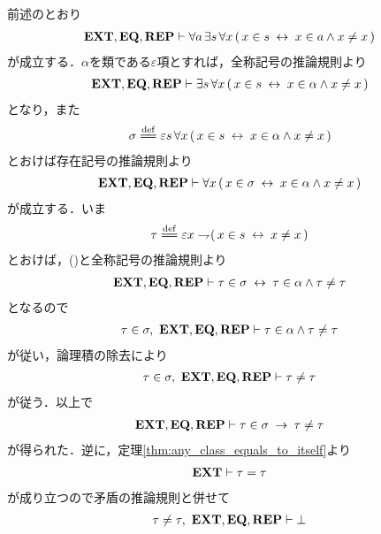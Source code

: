 	\begin{sketch}
		前述のとおり
		\begin{align}
			\mbox{{\bf EXT}},\mbox{{\bf EQ}},\mbox{{\bf REP}} \vdash \forall a\, \exists s\, \forall x\,
			(\, x \in s \hspace{0.25em}\leftrightarrow\hspace{0.25em} x \in a \wedge x \neq x\, )
			\label{fom:thm_emptyset_is_a_set_1}
		\end{align}
		が成立する．$\alpha$を類である$\varepsilon$項とすれば，全称記号の推論規則より
		\begin{align}
			\mbox{{\bf EXT}},\mbox{{\bf EQ}},\mbox{{\bf REP}} \vdash \exists s\, \forall x\,
			(\, x \in s \hspace{0.25em}\leftrightarrow\hspace{0.25em} x \in \alpha \wedge x \neq x\, )
		\end{align}
		となり，また
		\begin{align}
			\sigma \defeq \varepsilon s\, \forall x\,
			(\, x \in s \lrarrow x \in \alpha \wedge x \neq x\, )
		\end{align}
		とおけば存在記号の推論規則より
		\begin{align}
			\mbox{{\bf EXT}},\mbox{{\bf EQ}},\mbox{{\bf REP}} \vdash \forall x\,
			(\, x \in \sigma \hspace{0.25em}\leftrightarrow\hspace{0.25em} x \in \alpha \wedge x \neq x\, )
			\label{fom:thm_emptyset_is_a_set_2}
		\end{align}
		が成立する．いま
		\begin{align}
			\tau \defeq \varepsilon x \negation (\, x \in s \lrarrow x \neq x\, )
		\end{align}
		とおけば，()と全称記号の推論規則より
		\begin{align}
			\mbox{{\bf EXT}},\mbox{{\bf EQ}},\mbox{{\bf REP}} \vdash 
			\tau \in \sigma \hspace{0.25em}\leftrightarrow\hspace{0.25em} \tau \in \alpha \wedge \tau \neq \tau
		\end{align}
		となるので
		\begin{align}
			\tau \in \sigma,\ \mbox{{\bf EXT}},\mbox{{\bf EQ}},\mbox{{\bf REP}} \vdash
			\tau \in \alpha \wedge \tau \neq \tau
		\end{align}
		が従い，論理積の除去により
		\begin{align}
			\tau \in \sigma,\ \mbox{{\bf EXT}},\mbox{{\bf EQ}},\mbox{{\bf REP}} \vdash \tau \neq \tau
		\end{align}
		が従う．以上で
		\begin{align}
			\mbox{{\bf EXT}},\mbox{{\bf EQ}},\mbox{{\bf REP}} \vdash \tau \in \sigma \hspace{0.25em}\rightarrow\hspace{0.25em} \tau \neq \tau
			\label{fom:thm_emptyset_is_a_set_3}
		\end{align}
		が得られた．逆に，定理\ref{thm:any_class_equals_to_itself}より
		\begin{align}
			\mbox{{\bf EXT}} \vdash \tau = \tau 
		\end{align}
		が成り立つので矛盾の推論規則と併せて
		\begin{align}
			\tau \neq \tau,\ \EXTAX,\EQAX,\REPAX \vdash \bot

\end{align}
\end{sketch}
